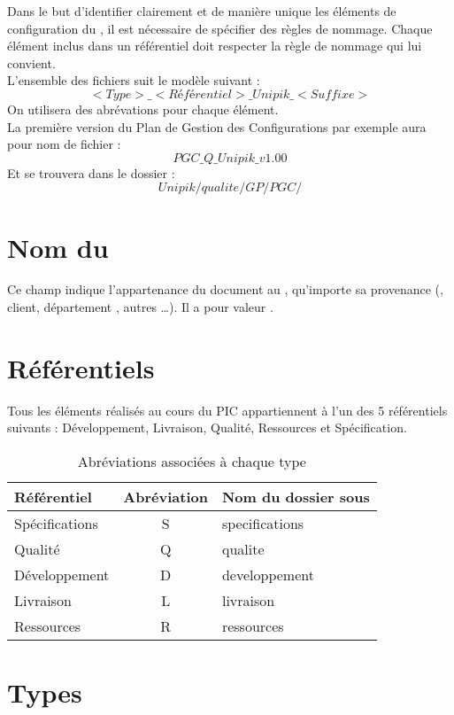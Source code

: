 Dans le but d'identifier clairement et de manière unique les éléments de configuration du \picCourt{}, il est nécessaire de spécifier des règles de nommage. Chaque élément inclus dans un référentiel doit respecter la règle de nommage qui lui convient.\\

L'ensemble des fichiers suit le modèle suivant :
\[
  <Type>\_<Référentiel>\_Unipik\_<Suffixe>
\]
On utilisera des abrévations pour chaque élément.\\
La première version du Plan de Gestion des Configurations par exemple aura pour nom de fichier :
\[
PGC\_Q\_Unipik\_v1.00
\]
Et se trouvera dans le dossier :
\[
Unipik/qualite/GP/PGC/
\]

\section{Nom du \picCourt{}}
Ce champ indique l'appartenance du document au \PICCourt{}, qu'importe sa provenance
 (\PICCourt{}, client, département \ASI{}, autres \dots{}). Il a pour valeur \textbf{\nomEquipe}.

\section{Référentiels}

Tous les éléments réalisés au cours du PIC appartiennent à l'un des 5 référentiels suivants : Développement, Livraison, Qualité, Ressources et Spécification.
\begin{table}[H]
\centering
	\begin{tabularx}{11cm}{|X|c|X|}
	\hline
	\rowcolor[gray]{0.85} Référentiel & Abréviation & Nom du dossier sous \git{} \\
	\hline
	Spécifications & S & specifications\\ 
	\hline
	Qualité & Q & qualite\\
	\hline
	Développement & D & developpement\\
	\hline	
	Livraison & L & livraison\\
	\hline 
	Ressources & R & ressources\\
	\hline
	\end{tabularx}
\caption{Abréviations associées à chaque type}
\label{Référentiel}
\end{table}

\section{Types}

